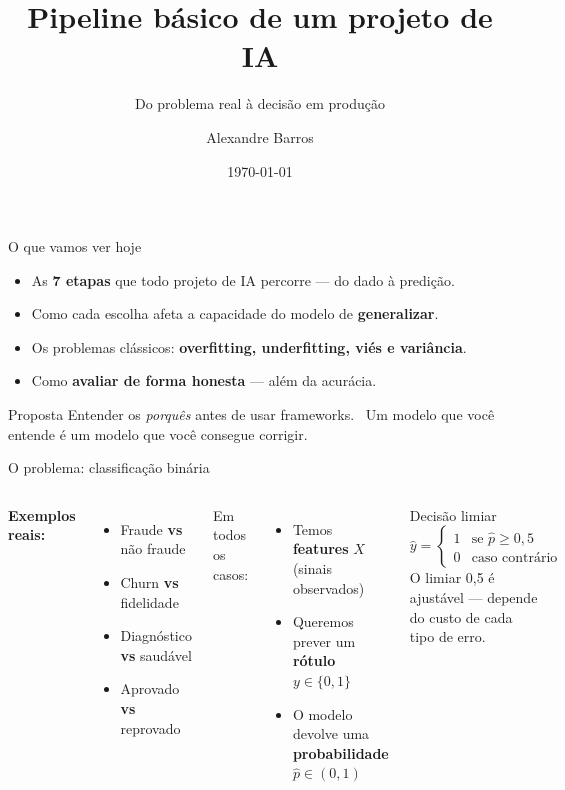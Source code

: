 \documentclass[aspectratio=169]{beamer}
\title[Pipeline IA do Zero]{Pipeline básico de um projeto de IA}
\subtitle{Do problema real à decisão em produção}
\author{Alexandre Barros}
\institute{%
  \href{https://alexand7e.dev.br}{alexand7e.dev.br}\\[4pt]
  \footnotesize\texttt{github.com/alexand7e/Pipeline-IA-do-Zero}
}
\date{\today}
\begin{document}

\begin{frame}
  \titlepage
\end{frame}

\begin{frame}{O que vamos ver hoje}
\begin{itemize}
  \item As \textbf{7 etapas} que todo projeto de IA percorre — do dado à predição.
  \item Como cada escolha afeta a capacidade do modelo de \textbf{generalizar}.
  \item Os problemas clássicos: \textbf{overfitting, underfitting, viés e variância}.
  \item Como \textbf{avaliar de forma honesta} — além da acurácia.
\end{itemize}
\vfill
\begin{block}{Proposta}
  Entender os \emph{porquês} antes de usar frameworks. \
  Um modelo que você entende é um modelo que você consegue corrigir.
\end{block}
\end{frame}

\begin{frame}{O problema: classificação binária}
\begin{columns}
\textbf{Exemplos reais:}
\begin{itemize}
  \item Fraude \textbf{vs} não fraude
  \item Churn \textbf{vs} fidelidade
  \item Diagnóstico \textbf{vs} saudável
  \item Aprovado \textbf{vs} reprovado
\end{itemize}
\vspace{8pt}
Em todos os casos:
\begin{itemize}
  \item Temos \textbf{features} $X$ (sinais observados)
  \item Queremos prever um \textbf{rótulo} $y \in \{0, 1\}$
  \item O modelo devolve uma \textbf{probabilidade} $\hat{p} \in (0, 1)$
\end{itemize}
\begin{block}{Decisão limiar}
  \[
    \hat{y} =
    \begin{cases}
      1 & \text{se } \hat{p} \geq 0{,}5 \\
      0 & \text{caso contrário}
    \end{cases}
  \]
  O limiar 0,5 é ajustável — depende do custo de cada tipo de erro.
\end{block}
\end{columns}
\end{frame}
\end{document}
